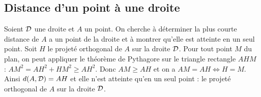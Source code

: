 \subsection{Distance d'un point à une droite}

Soient $\mathcal{D}$ une droite et $A$ un point. On cherche à déterminer la plus courte distance de $A$ a un point de la droite et à montrer qu'elle est atteinte en un seul point. Soit $H$ le projeté orthogonal de $A$ sur la droite $\mathcal{D}$. Pour tout point $M$ du plan, on peut appliquer le théorème de Pythagore sur le triangle rectangle $AHM$ : $AM^2=AH^2+HM^2 \geq AH^2$. Donc $AM \geq AH$ et on a $AM=AH \iff H=M$. Ainsi $d(A,\mathcal{D})=AH$ et elle n'est atteinte qu'en un seul point : le projeté orthogonal de $A$ sur la droite $\mathcal{D}$.%

